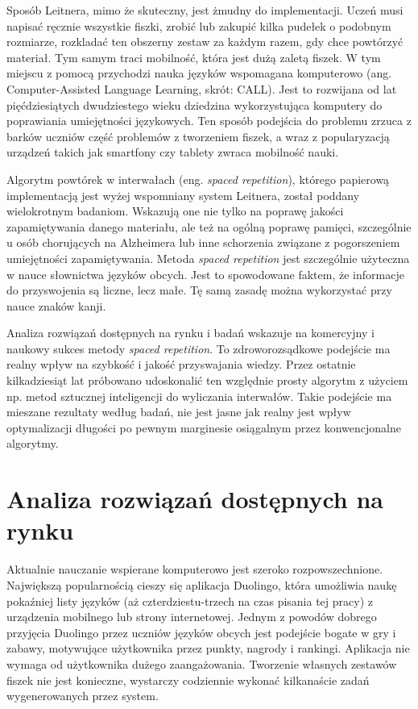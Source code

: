 \documentclass[a4paper,twoside,12pt]{book}
\begin{document}
Sposób Leitnera, mimo że skuteczny, jest żmudny do implementacji. Uczeń musi napisać ręcznie wszystkie fiszki, zrobić lub zakupić kilka pudełek o podobnym rozmiarze, rozkladać ten obszerny zestaw za każdym razem, gdy chce powtórzyć materiał. Tym samym traci mobilność, która jest dużą zaletą fiszek. W tym miejscu z pomocą przychodzi nauka języków wspomagana komputerowo (ang. Computer-Assisted Language Learning, skrót: CALL). Jest to rozwijana od lat pięćdziesiątych dwudziestego wieku dziedzina wykorzystująca komputery do poprawiania umiejętności językowych. Ten sposób podejścia do problemu zrzuca z barków uczniów część problemów z tworzeniem fiszek, a wraz z popularyzacją urządzeń takich jak smartfony czy tablety zwraca mobilność nauki. 

Algorytm powtórek w interwałach (eng. \textit{spaced repetition}), którego papierową implementacją jest wyżej wspomniany system Leitnera, został poddany wielokrotnym badaniom. Wskazują one nie tylko na poprawę jakości zapamiętywania danego materiału, ale też na ogólną poprawę pamięci, szczególnie u osób chorujących na Alzheimera lub inne schorzenia związane z pogorszeniem umiejętności zapamiętywania\cite{bib:artykul}. Metoda \textit{spaced repetition} jest szczególnie użyteczna w nauce słownictwa języków obcych. Jest to spowodowane faktem, że informacje do przyswojenia są liczne, lecz małe. Tę samą zasadę można wykorzystać przy nauce znaków kanji. 

Analiza rozwiązań dostępnych na rynku i badań wskazuje na komercyjny i naukowy sukces metody \textit{spaced repetition}. To zdroworozsądkowe podejście ma realny wpływ na szybkość i jakość przyswajania wiedzy. Przez ostatnie kilkadziesiąt lat próbowano udoskonalić ten względnie prosty algorytm z użyciem np. metod sztucznej inteligencji do wyliczania interwałów. Takie podejście ma mieszane rezultaty według badań, nie jest jasne jak realny jest wpływ optymalizacji długości po pewnym marginesie osiągalnym przez konwencjonalne algorytmy.

\section{Analiza rozwiązań dostępnych na rynku}

Aktualnie nauczanie wspierane komputerowo jest szeroko rozpowszechnione. Największą popularnością cieszy się aplikacja Duolingo, która umożliwia naukę pokaźniej listy języków (aż czterdziestu-trzech na czas pisania tej pracy) z urządzenia mobilnego lub strony internetowej. Jednym z powodów dobrego przyjęcia Duolingo przez uczniów języków obcych jest podejście bogate w gry i zabawy, motywujące użytkownika przez punkty, nagrody i rankingi. Aplikacja nie wymaga od użytkownika dużego zaangażowania. Tworzenie własnych zestawów fiszek nie jest konieczne, wystarczy codziennie wykonać kilkanaście zadań wygenerowanych przez system. 
\end{document}
